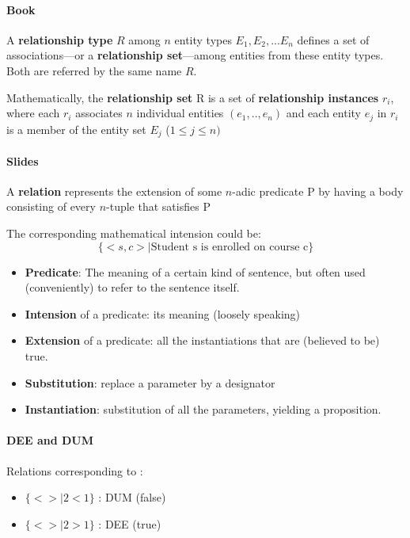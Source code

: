 \begin{itemize}
    \paragraph{Book}
    A \textbf{relationship type} $R$ among $n$ entity types $E_1, E_2, ...E_n$ defines a set of associations—or a \textbf{relationship set}—among entities from these entity types. Both are referred by the same name $R$.
    
    Mathematically, the \textbf{relationship set} R is a set of \textbf{relationship instances} $r_i$, where each $r_i$ associates $n$ individual entities $(e_1,..,e_n)$ and each entity $e_j$ in $r_i$ is a member of the entity set $E_j$ ($1\leq j\leq n)$

    \paragraph{Slides}
    A \textbf{relation} represents the extension of some $n$-adic predicate P by having a body consisting of every $n$-tuple that satisfies P

    The corresponding mathematical intension could be: $$\{ < s, c > | \text{Student s is enrolled on course c} \}$$
    
    \begin{itemize}
        \item \textbf{Predicate}: The meaning of a certain kind of sentence, but often used (conveniently) to refer to the sentence itself.
        \item \textbf{Intension} of a predicate: its meaning (loosely speaking)
        \item \textbf{Extension} of a predicate: all the instantiations that are (believed to be) true.
        \item \textbf{Substitution}: replace a parameter by a designator
        \item \textbf{Instantiation}: substitution of all the parameters, yielding a proposition.
    \end{itemize}

    \paragraph{DEE and DUM}
    Relations corresponding to :
    \begin{itemize}
        \item $\{< > | 2 < 1\}$ : DUM (false)
        \item $\{< > | 2 > 1\}$ : DEE (true)
    \end{itemize}
    

\end{itemize}
